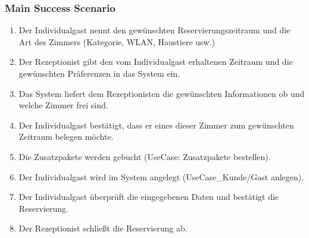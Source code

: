 \documentclass[./detailed_overview_usecases.tex]{subfiles}
\begin{document}
    \subsubsection*{Main Success Scenario}
    \begin{enumerate}
        \item Der Individualgast nennt den gewünschten Reservierungszeitraum und die Art des Zimmers (Kategorie, WLAN, Haustiere usw.)
        \item Der Rezeptionist gibt den vom Individualgast erhaltenen Zeitraum und die gewünschten Präferenzen in das System ein.
        \item Das System liefert dem Rezeptionisten die gewünschten Informationen ob und welche Zimmer frei sind.
        \item Der Individualgast bestätigt, dass er eines dieser Zimmer zum gewünschten Zeitraum belegen möchte.
        \item Die Zusatzpakete werden gebucht (UseCase: Zusatzpakete bestellen).
        \item Der Individualgast wird im System angelegt (UseCase_Kunde/Gast anlegen).
        \item Der Individualgast überprüft die eingegebenen Daten und bestätigt die Reservierung.
        \item Der Rezeptionist schließt die Reservierung ab.
    \end{enumerate}
\end{document}
